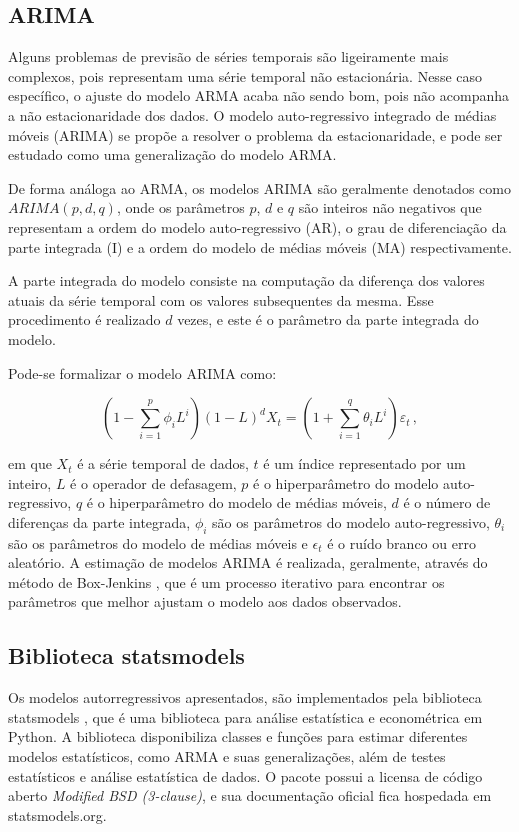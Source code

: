 \subsection{ARIMA}
Alguns problemas de previsão de séries temporais são ligeiramente mais complexos, pois representam uma série temporal não estacionária. Nesse caso específico, o ajuste do modelo ARMA acaba não sendo bom, pois não acompanha a não estacionaridade dos dados. O modelo auto-regressivo integrado de médias móveis (ARIMA) se propõe a resolver o problema da estacionaridade, e pode ser estudado como uma generalização do modelo ARMA.

De forma análoga ao ARMA, os modelos ARIMA são geralmente denotados como $ARIMA(p, d, q)$, onde os parâmetros $p$, $d$ e $q$ são inteiros não negativos que representam a ordem do modelo auto-regressivo (AR), o grau de diferenciação da parte integrada (I) e a ordem do modelo de médias móveis (MA) respectivamente.

A parte integrada do modelo consiste na computação da diferença dos valores atuais da série temporal com os valores subsequentes da mesma. Esse procedimento é realizado $d$ vezes, e este é o parâmetro da parte integrada do modelo.

Pode-se formalizar o modelo ARIMA como:

\begin{equation}
    \left(1-\sum_{i=1}^{p} \phi_{i} L^{i}\right)(1-L)^{d} X_{t}=\left(1+\sum_{i=1}^{q} \theta_{i} L^{i}\right) \varepsilon_{t}\, ,
\end{equation}

em que $X_{t}$ é a série temporal de dados, $t$ é um índice representado por um inteiro, $L$ é o operador de defasagem, $p$ é o hiperparâmetro do modelo auto-regressivo, $q$ é o hiperparâmetro do modelo de médias móveis, $d$ é o número de diferenças da parte integrada, $\phi_{i}$ são os parâmetros do modelo auto-regressivo, $\theta_{i}$ são os parâmetros do modelo de médias móveis e $\epsilon_{t}$ é o ruído branco ou erro aleatório. A estimação de modelos ARIMA é realizada, geralmente, através do método de Box-Jenkins \cite{box&jenkins}, que é um processo iterativo para encontrar os parâmetros que melhor ajustam o modelo aos dados observados.

\subsection{Biblioteca statsmodels}
Os modelos autorregressivos apresentados, são implementados pela biblioteca statsmodels \cite{seabold2010statsmodels}, que é uma biblioteca para análise estatística e econométrica em Python. A biblioteca disponibiliza classes e funções para estimar diferentes modelos estatísticos, como ARMA e suas generalizações, além de testes estatísticos e análise estatística de dados. O pacote possui a licensa de código aberto \textit{Modified BSD (3-clause)}, e sua documentação oficial fica hospedada em statsmodels.org.


